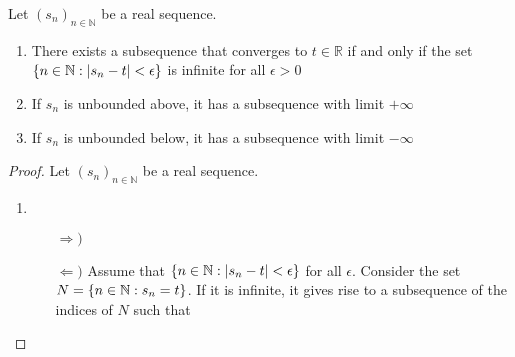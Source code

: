 \documentclass[../notes.tex]{subfiles}
\begin{document}
\begin{theorem}
    \label{thm:propssubsequences}
    Let $(s_n)_{n\in \mathbb{N}}$ be a real sequence.
    \begin{enumerate}
        \item There exists a subsequence that converges to $t \in \mathbb{R}$ if and only if the set $\qty{n \in \mathbb{N} : |s_n - t| < \epsilon}$ is infinite for all $\epsilon > 0$
        \item If $s_n$ is unbounded above, it has a subsequence with limit $+\infty$
        \item If $s_n$ is unbounded below, it has a subsequence with limit $-\infty$
    \end{enumerate}
\end{theorem}
\begin{proof}
    Let $(s_n)_{n\in \mathbb{N}}$ be a real sequence.
    \begin{enumerate}
        \item
        \begin{enumerate}
            \item[$\Rightarrow)$] %
            \item[$\Leftarrow)$]
                Assume that $\qty{n \in \mathbb{N} : |s_n - t| < \epsilon}$ for all $\epsilon$. Consider the set $N = \qty{n \in \mathbb{N} : s_n = t}$. If it is infinite, it gives rise to a subsequence of the indices of $N$ such that 


\end{enumerate}
\end{enumerate}
\end{proof}
\end{document}
